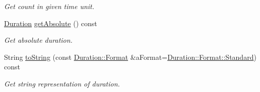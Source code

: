 \begin{DoxyCompactItemize}
\begin{DoxyCompactList}\small\item\em Get count in given time unit. \end{DoxyCompactList}\item 
\hyperlink{classlibrary_1_1physics_1_1time_1_1_duration}{Duration} \hyperlink{classlibrary_1_1physics_1_1time_1_1_duration_afbe401469b6b6356439d6f7c5b21e67e}{get\+Absolute} () const
\begin{DoxyCompactList}\small\item\em Get absolute duration. \end{DoxyCompactList}\item 
String \hyperlink{classlibrary_1_1physics_1_1time_1_1_duration_a06f24e6cc8cb867abbae969c5f199513}{to\+String} (const \hyperlink{classlibrary_1_1physics_1_1time_1_1_duration_ace85659cafe97df992c0e4273bdc88d1}{Duration\+::\+Format} \&a\+Format=\hyperlink{classlibrary_1_1physics_1_1time_1_1_duration_ace85659cafe97df992c0e4273bdc88d1aeb6d8ae6f20283755b339c0dc273988b}{Duration\+::\+Format\+::\+Standard}) const
\begin{DoxyCompactList}\small\item\em Get string representation of duration. \end{DoxyCompactList}\end{DoxyCompactItemize}
